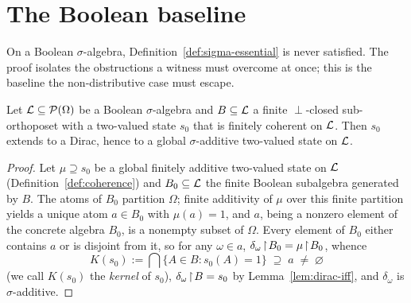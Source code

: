 \section{The Boolean baseline}\label{sec:boolean}

On a Boolean $\sigma$-algebra, Definition~\ref{def:sigma-essential} is never
satisfied. The proof isolates the obstructions a witness must overcome at
once; this is the baseline the non-distributive case must escape.

\begin{proposition}\label{prop:boolean}
Let $\mathcal{L} \subseteq \mathcal{P}(\Omega)$ be a Boolean $\sigma$-algebra and $B \subseteq
\mathcal{L}$ a finite $\perp$-closed sub-orthoposet with a two-valued state $s_0$ that is
finitely coherent on $\mathcal{L}$. Then $s_0$ extends to a Dirac, hence to a global
$\sigma$-additive two-valued state on $\mathcal{L}$.
\end{proposition}

\begin{proof}
Let $\mu\supseteq s_0$ be a global finitely additive two-valued state on $\mathcal{L}$
(Definition~\ref{def:coherence}) and $B_0 \subseteq \mathcal{L}$ the finite Boolean
subalgebra generated by $B$. The atoms of $B_0$ partition $\Omega$; finite
additivity of $\mu$ over this finite partition yields a unique atom $a\in B_0$
with $\mu(a)=1$, and $a$, being a nonzero element of the concrete algebra $B_0$,
is a nonempty subset of $\Omega$. Every element of $B_0$ either contains $a$ or
is disjoint from it, so for any $\omega\in a$,
$\delta_\omega\!\restriction\! B_0 = \mu\!\restriction\! B_0$, whence
\[
  K(s_0) := \bigcap\{A \in B : s_0(A) = 1\} \;\supseteq\; a \;\neq\; \varnothing
\]
(we call $K(s_0)$ the \emph{kernel} of $s_0$), $\delta_\omega\!\restriction\! B = s_0$ by
Lemma~\ref{lem:dirac-iff}, and $\delta_\omega$ is $\sigma$-additive.
\end{proof}

